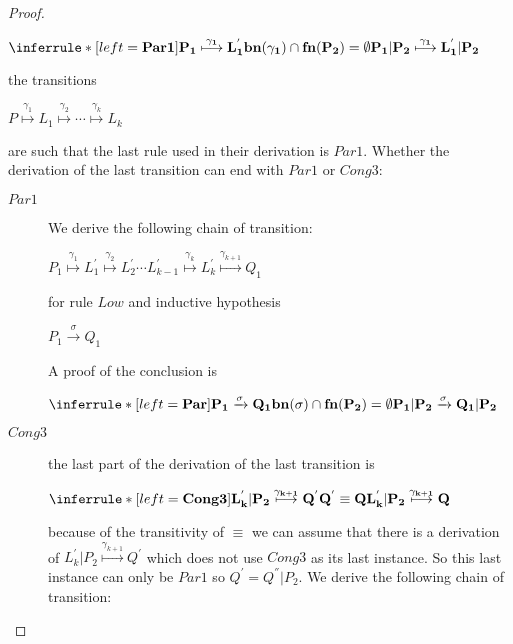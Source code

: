 \begin{proposition}
\begin{proof}
\begin{description}
		\begin{center}
		  $\inferrule* [left=\bf{Par1}]{
			P_{1} \stackrel{\gamma_{1}}{\longmapsto} L_{1}^{'}
		      \\
			bn(\gamma_{1})\cap fn(P_{2})=\emptyset
		    }{
		      P_{1}|P_{2} \stackrel{\gamma_{1}}{\longmapsto} L_{1}^{'}|P_{2}
		  }$
		\end{center}
		the transitions 
		\begin{center}
		  $P \stackrel{\gamma_{1}}{\longmapsto} L_{1} \stackrel{\gamma_{2}}{\longmapsto} \cdots \stackrel{\gamma_{k}}{\longmapsto} L_{k}$ 
		\end{center}
		are such that the last rule used in their derivation is $Par1$. Whether the derivation of the last transition can end with $Par1$ or $Cong3$:
		\begin{description}
		  \item[$Par1$]
		    We derive the following chain of transition:
		    \begin{center}
		      $P_{1} \stackrel{\gamma_{1}}{\longmapsto} L_{1}^{'} \stackrel{\gamma_{2}}{\longmapsto} L_{2}^{'} \cdots L_{k-1}^{'} \stackrel{\gamma_{k}}{\longmapsto} L_{k}^{'}\stackrel{\gamma_{k+1}}{\longmapsto} Q_{1}$ 
		    \end{center}
		    for rule $Low$ and inductive hypothesis
		    \begin{center}
		      $P_{1} \xrightarrow{\sigma} Q_{1}$ 
		    \end{center}
		    A proof of the conclusion is
		    \begin{center}
		      $\inferrule* [left=\bf{Par}]{
			  P_{1} \xrightarrow{\sigma} Q_{1}
			\\
			  bn(\sigma)\cap fn(P_{2})=\emptyset
		      }{
			P_{1}|P_{2} \xrightarrow{\sigma} Q_{1}|P_{2}
		      }$ 
		    \end{center}
		  \item[$Cong3$]
		    the last part of the derivation of the last transition is
		    \begin{center}
		      $\inferrule* [left=\bf{Cong3}]{
			  L_{k}^{'}|P_{2} \stackrel{\gamma_{k+1}}{\longmapsto} Q^{'}
			\\
			  Q^{'} \equiv Q
		      }{
			L_{k}^{'}|P_{2} \stackrel{\gamma_{k+1}}{\longmapsto} Q
		      }$ 		      
		    \end{center}
		    because of the transitivity of $\equiv$ we can assume that there is a derivation of $L_{k}^{'}|P_{2} \stackrel{\gamma_{k+1}}{\longmapsto} Q^{'}$ which does not use $Cong3$ as its last instance. So this last instance can only be $Par1$ so $Q^{'}=Q^{''}|P_{2}$. We derive the following chain of transition:

\end{description}
\end{description}
\end{proof}
\end{proposition}

